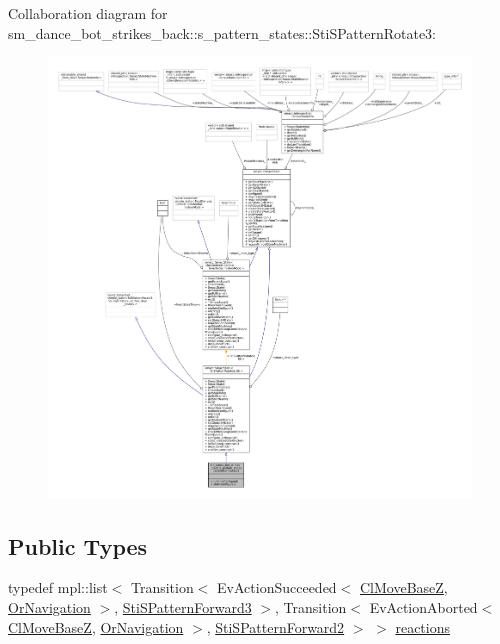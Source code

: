 Collaboration diagram for sm\+\_\+dance\+\_\+bot\+\_\+strikes\+\_\+back\+:\+:s\+\_\+pattern\+\_\+states\+:\+:Sti\+S\+Pattern\+Rotate3\+:
\nopagebreak
\begin{figure}[H]
\begin{center}
\leavevmode
\includegraphics[width=350pt]{structsm__dance__bot__strikes__back_1_1s__pattern__states_1_1StiSPatternRotate3__coll__graph}
\end{center}
\end{figure}
\subsection*{Public Types}
\begin{DoxyCompactItemize}
\item 
typedef mpl\+::list$<$ Transition$<$ Ev\+Action\+Succeeded$<$ \hyperlink{classmove__base__z__client_1_1ClMoveBaseZ}{Cl\+Move\+BaseZ}, \hyperlink{classsm__dance__bot__strikes__back_1_1OrNavigation}{Or\+Navigation} $>$, \hyperlink{structsm__dance__bot__strikes__back_1_1s__pattern__states_1_1StiSPatternForward3}{Sti\+S\+Pattern\+Forward3} $>$, Transition$<$ Ev\+Action\+Aborted$<$ \hyperlink{classmove__base__z__client_1_1ClMoveBaseZ}{Cl\+Move\+BaseZ}, \hyperlink{classsm__dance__bot__strikes__back_1_1OrNavigation}{Or\+Navigation} $>$, \hyperlink{structsm__dance__bot__strikes__back_1_1s__pattern__states_1_1StiSPatternForward2}{Sti\+S\+Pattern\+Forward2} $>$ $>$ \hyperlink{structsm__dance__bot__strikes__back_1_1s__pattern__states_1_1StiSPatternRotate3_a01494011589ff9f082011cd9a33574e6}{reactions}
\end{DoxyCompactItemize}
